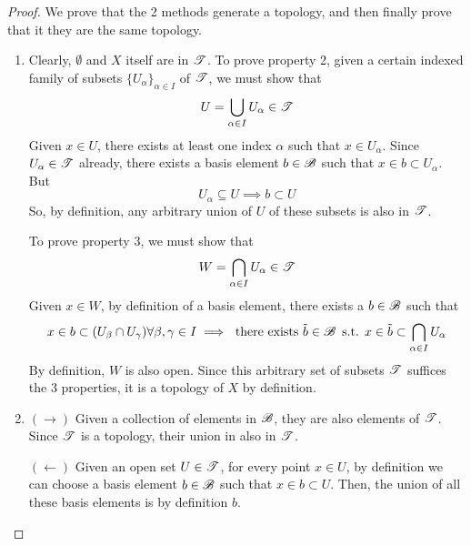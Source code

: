   \begin{proof}
    We prove that the 2 methods generate a topology, and then finally prove that it they are the same topology. 
    \begin{enumerate}
      \item Clearly, $\emptyset$ and $X$ itself are in $\operatorname{\mathscr{T}}$. To prove property 2, given a certain indexed family of subsets $\{U_\alpha\}_{\alpha \in I}$ of $\operatorname{\mathscr{T}}$, we must show that 
      \begin{equation}
        U = \bigcup_{\alpha \in I} U_\alpha \in \operatorname{\mathscr{T}}
      \end{equation}
      Given $x \in U$, there exists at least one index $\alpha$ such that $x \in U_\alpha$. Since $U_\alpha \in \operatorname{\mathscr{T}}$ already, there exists a basis element $b \in \operatorname{\mathscr{B}}$ such that $x \in b \subset U_\alpha$. But 
      \begin{equation}
        U_\alpha \subseteq U \implies b \subset U
      \end{equation}
      So, by definition, any arbitrary union of $U$ of these subsets is also in $\operatorname{\mathscr{T}}$. 

      To prove property 3, we must show that 
      \begin{equation}
        W = \bigcap_{\alpha \in I} U_\alpha \in \operatorname{\mathscr{T}}
      \end{equation}
      Given $x \in W$, by definition of a basis element, there exists a $b \in \operatorname{\mathscr{B}}$ such that 
      \begin{equation}
        x \in b \subset (U_\beta \cap U_\gamma) \forall \beta, \gamma \in I \implies \text{ there exists } \Tilde{b} \in \operatorname{\mathscr{B}} \text{ s.t. } x \in \Tilde{b} \subset \bigcap_{\alpha \in I} U_\alpha
      \end{equation}
      By definition, $W$ is also open. Since this arbitrary set of subsets $\operatorname{\mathscr{T}}$ suffices the 3 properties, it is a topology of $X$ by definition. 

      \item $(\rightarrow)$ Given a collection of elements in $\operatorname{\mathscr{B}}$, they are also elements of $\operatorname{\mathscr{T}}$. Since $\operatorname{\mathscr{T}}$ is a topology, their union in also in $\operatorname{\mathscr{T}}$. 

      $(\leftarrow)$ Given an open set $U \in \operatorname{\mathscr{T}}$, for every point $x \in U$, by definition we can choose a basis element $b \in \operatorname{\mathscr{B}}$ such that $x \in b \subset U$. Then, the union of all these basis elements is by definition $b$. 
        
    \end{enumerate}
  \end{proof}

